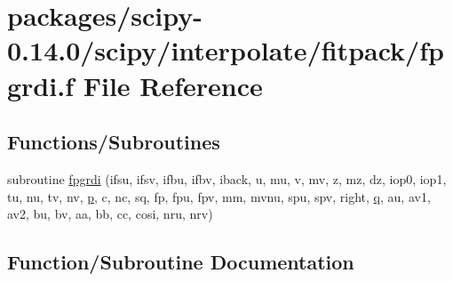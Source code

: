 \hypertarget{fpgrdi_8f}{}\section{packages/scipy-\/0.14.0/scipy/interpolate/fitpack/fpgrdi.f File Reference}
\label{fpgrdi_8f}
\subsection*{Functions/\+Subroutines}
\begin{DoxyCompactItemize}
\item 
subroutine \hyperlink{fpgrdi_8f_a887292c125fda566b64e8ee65dbfa9e4}{fpgrdi} (ifsu, ifsv, ifbu, ifbv, iback, u, mu, v, mv, z, mz, dz, iop0, iop1, tu, nu, tv, nv, \hyperlink{indexexpr_8h_a2b8c103eb5bfc196fbc3d29923e28ac1}{p}, c, nc, sq, fp, fpu, fpv, mm, mvnu, spu, spv, right, \hyperlink{indexexpr_8h_ac886c3584e464b5533390d7440c9dd98}{q}, au, av1, av2, bu, bv, aa, bb, cc, cosi, nru, nrv)
\end{DoxyCompactItemize}


\subsection{Function/\+Subroutine Documentation}
\hypertarget{fpgrdi_8f_a887292c125fda566b64e8ee65dbfa9e4}{}
